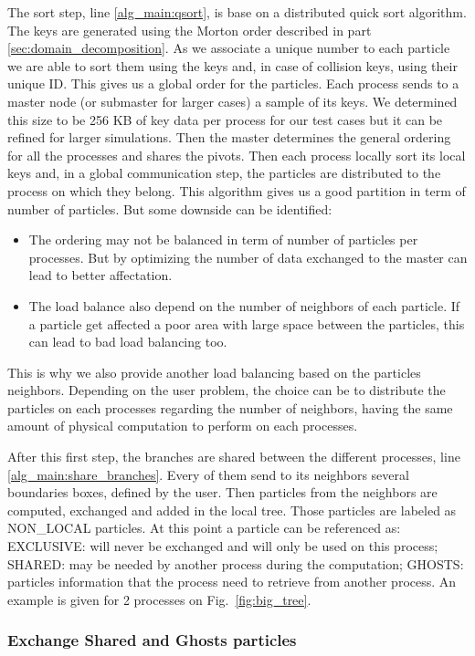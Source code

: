 The sort step, line \ref{alg_main:qsort}, is base on a distributed quick sort algorithm. 
The keys are generated using the Morton order described in part \ref{sec:domain_decomposition}. 
As we associate a unique number to each particle we are able to sort them using the keys and, in case of collision keys, using their unique ID. 
This gives us a global order for the particles. 
Each process sends to a master node (or submaster for larger cases) a sample of its keys. 
We determined this size to be 256 KB of key data per process for our test cases but it can be refined for larger simulations. 
Then the master determines the general ordering for all the processes and shares the pivots. 
Then each process locally sort its local keys and, in a global communication step, the particles are distributed to the process on which they belong. 
This algorithm gives us a good partition in term of number of particles. 
But some downside can be identified:
\begin{itemize}
	\item The ordering may not be balanced in term of number of particles per processes. But by optimizing the number of data exchanged to the master can lead to better affectation. 
	\item The load balance also depend on the number of neighbors of each particle. If a particle get affected a poor area with large space between the particles, this can lead to bad load balancing too. 
\end{itemize}
This is why we also provide another load balancing based on the particles neighbors. 
Depending on the user problem, the choice can be to distribute the particles on each processes regarding the number of neighbors, having the same amount of physical computation to perform on each processes. 

After this first step, the branches are shared between the different processes, line \ref{alg_main:share_branches}. 
Every of them send to its neighbors several boundaries boxes, defined by the user. 
Then particles from the neighbors are computed, exchanged and added in the local tree. 
Those particles are labeled as NON\_LOCAL particles. 
At this point a particle can be referenced as: EXCLUSIVE: will never be exchanged and will only be used on this process; SHARED: may be needed by another process during the computation; GHOSTS: particles information that the process need to retrieve from another process. 
An example is given for 2 processes on Fig.~\ref{fig:big_tree}.

\subsubsection{Exchange Shared and Ghosts particles}


